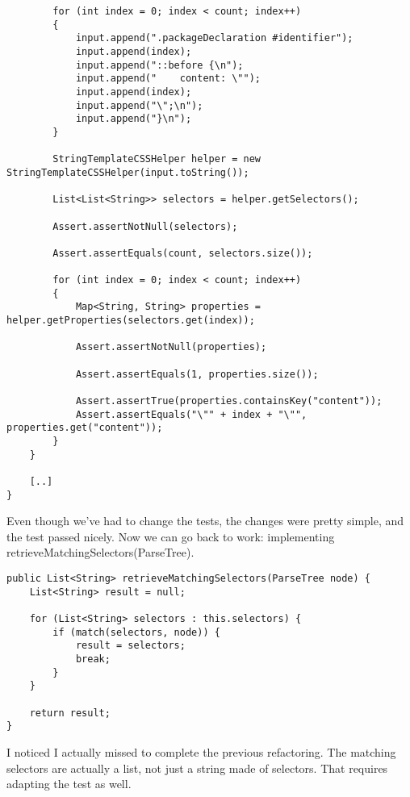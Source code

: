 \documentclass[11pt]{article}
\begin{document}
\begin{verbatim}
        for (int index = 0; index < count; index++)
        {
            input.append(".packageDeclaration #identifier");
            input.append(index);
            input.append("::before {\n");
            input.append("    content: \"");
            input.append(index);
            input.append("\";\n");
            input.append("}\n");
        }

        StringTemplateCSSHelper helper = new StringTemplateCSSHelper(input.toString());

        List<List<String>> selectors = helper.getSelectors();

        Assert.assertNotNull(selectors);

        Assert.assertEquals(count, selectors.size());

        for (int index = 0; index < count; index++)
        {
            Map<String, String> properties = helper.getProperties(selectors.get(index));

            Assert.assertNotNull(properties);

            Assert.assertEquals(1, properties.size());

            Assert.assertTrue(properties.containsKey("content"));
            Assert.assertEquals("\"" + index + "\"", properties.get("content"));
        }
    }

    [..]
}
\end{verbatim}

Even though we've had to change the tests, the changes were pretty simple, and the test passed nicely. Now we can go
back to work: implementing retrieveMatchingSelectors(ParseTree).

\begin{verbatim}
public List<String> retrieveMatchingSelectors(ParseTree node) {
    List<String> result = null;

    for (List<String> selectors : this.selectors) {
        if (match(selectors, node)) {
            result = selectors;
            break;
        }
    }

    return result;
}
\end{verbatim}

I noticed I actually missed to complete the previous refactoring. The matching selectors are actually a list, not
just a string made of selectors. That requires adapting the test as well.
\end{document}
